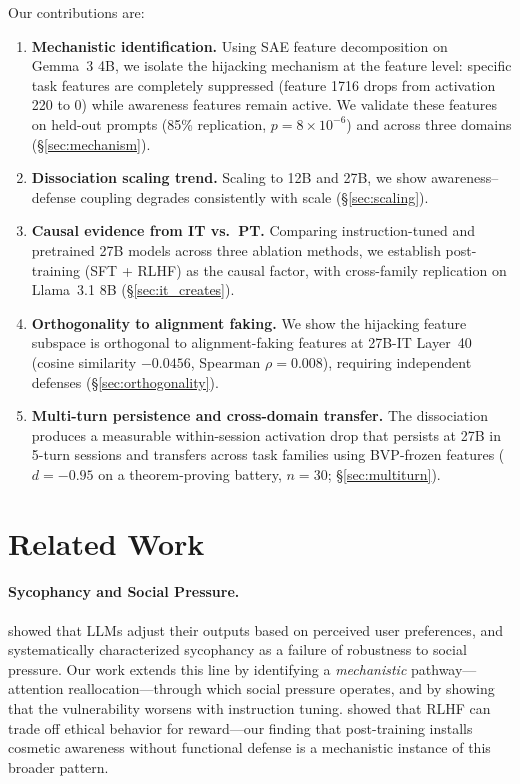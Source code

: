 \documentclass[10pt,twocolumn]{article}
\newcommand{\gemma}{Gemma~3\xspace}
\begin{document}
Our contributions are:
\begin{enumerate}
    \item \textbf{Mechanistic identification.} Using SAE feature decomposition on \gemma 4B, we isolate the hijacking mechanism at the feature level: specific task features are completely suppressed (feature 1716 drops from activation 220 to 0) while awareness features remain active. We validate these features on held-out prompts (85\% replication, $p = 8 \times 10^{-6}$) and across three domains (\S\ref{sec:mechanism}).
    \item \textbf{Dissociation scaling trend.} Scaling to 12B and 27B, we show awareness--defense coupling degrades consistently with scale (\S\ref{sec:scaling}).
    \item \textbf{Causal evidence from IT vs.\ PT.} Comparing instruction-tuned and pretrained 27B models across three ablation methods, we establish post-training (SFT + RLHF) as the causal factor, with cross-family replication on Llama~3.1 8B (\S\ref{sec:it_creates}).
    \item \textbf{Orthogonality to alignment faking.} We show the hijacking feature subspace is orthogonal to alignment-faking features at 27B-IT Layer~40 (cosine similarity $-0.0456$, Spearman $\rho = 0.008$), requiring independent defenses (\S\ref{sec:orthogonality}).
    \item \textbf{Multi-turn persistence and cross-domain transfer.} The dissociation produces a measurable within-session activation drop that persists at 27B in 5-turn sessions and transfers across task families using BVP-frozen features ($d = -0.95$ on a theorem-proving battery, $n = 30$; \S\ref{sec:multiturn}).
\end{enumerate}

\section{Related Work}
\label{sec:related}

\paragraph{Sycophancy and Social Pressure.}
\citet{perez2022discovering} showed that LLMs adjust their outputs based on perceived user preferences, and \citet{sharma2023towards} systematically characterized sycophancy as a failure of robustness to social pressure.
Our work extends this line by identifying a \emph{mechanistic} pathway---attention reallocation---through which social pressure operates, and by showing that the vulnerability worsens with instruction tuning.
\citet{pan2023rewards} showed that RLHF can trade off ethical behavior for reward---our finding that post-training installs cosmetic awareness without functional defense is a mechanistic instance of this broader pattern.
\end{document}
